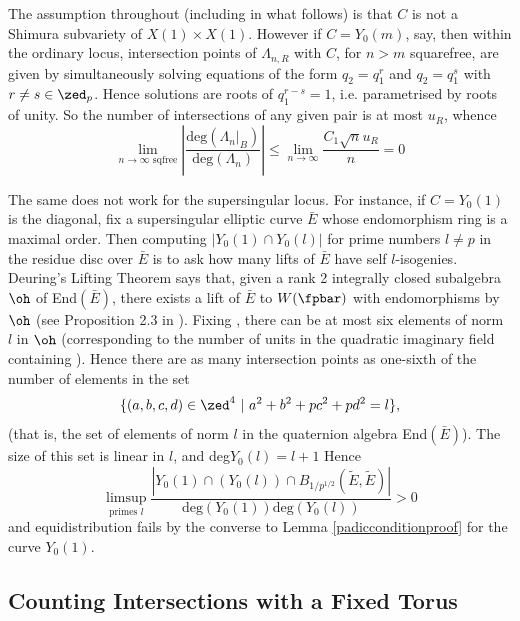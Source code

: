 \documentclass[12pt,letterpaper]{article}
\begin{document}
	\begin{rem} \label{CModular}
		The assumption throughout (including in what follows) is that $C$ is not a Shimura subvariety of $X(1)\times X(1)$. However if $C=Y_0(m)$, say, then within the ordinary locus, intersection points of $\Lambda_{n,R}$ with $C$, for $n>m$ squarefree, are given by simultaneously solving equations of the form $q_2 = q_1^r$ and $q_2=q_1^s$ with $r\ne s\in \zed_p$. Hence solutions are roots of $q_1^{r-s}=1$, i.e. parametrised by roots of unity. So the number of intersections of any given pair is at most $u_R$, whence
			\[\lim_{n\to\infty \text{ sqfree}}\left|\frac{\text{deg}(\Lambda_{n}|_B)}{\text{deg}(\Lambda_{n})}\right|\leq \lim_{n\to\infty}\frac{C_1\sqrt{n} u_R}{n}=0\]
			
		The same does not work for the supersingular locus. For instance, if $C=Y_0(1)$ is the diagonal, fix a supersingular elliptic curve $\bar{E}$ whose endomorphism ring is a maximal order. Then computing $|Y_0(1)\cap Y_0(l)|$ for prime numbers $l\ne p$ in the residue disc over $\bar{E}$ is to ask how many lifts of $\bar{E}$ have self $l$-isogenies. 
		Deuring's Lifting Theorem says that, given a rank 2 integrally closed subalgebra $\oh$ of End$(\bar{E})$, there exists a lift of $\bar{E}$ to $W(\fpbar)$ with endomorphisms by $\oh$ (see Proposition 2.3 in \cite{OS19}). Fixing \oh, there can be at most six elements of norm $l$ in $\oh$ (corresponding to the number of units in the quadratic imaginary field containing \oh). Hence there are as many intersection points as one-sixth of the number of elements in the set
		\[\{(a,b,c,d)\in \zed^4 \ | \ a^2+b^2+pc^2+pd^2 = l\},\] (that is, the set of elements of norm $l$ in the quaternion algebra End$(\bar{E})$). The size of this set is linear in $l$, and deg$Y_0(l)=l+1$
		 Hence 
		\[\limsup_{\text{primes }l}\frac{|Y_0(1)\cap(Y_0(l))\cap B_{1/p^{1/2}}(\tilde{E},\tilde{E})|}{\text{deg}(Y_0(1))\text{deg}(Y_0(l))}>0\] and equidistribution fails by the converse to Lemma \ref{padicconditionproof} for the curve $Y_0(1)$.
	\end{rem}
	
	
	
	
	
	
	
	
	
	
	
	
	
	\subsection{Counting Intersections with a Fixed Torus} \label{FinishProof}
	
\end{document}
